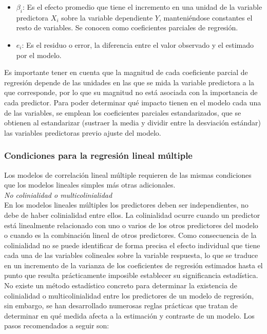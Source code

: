 {\begin{itemize}
\item $\beta_i$: Es el efecto promedio que tiene el incremento en una unidad de la variable predictora $X_i$ sobre la variable dependiente $Y$, manteniéndose constantes el resto de variables. Se conocen como coeficientes parciales de regresión.
\item $e_i$: Es el residuo o error, la diferencia entre el valor observado y el estimado por el modelo.
\end{itemize}

\noindent Es importante tener en cuenta que la magnitud de cada coeficiente parcial de regresión depende de las unidades en las que se mida la variable predictora a la que corresponde, por lo que su magnitud no está asociada con la importancia de cada predictor. Para poder determinar qué impacto tienen en el modelo cada una de las variables, se emplean los coeficientes parciales estandarizados, que se obtienen al estandarizar (sustraer la media y dividir entre la desviación estándar) las variables predictoras previo ajuste del modelo.

\subsubsection{Condiciones para la regresión lineal múltiple}
\noindent Los modelos de correlación lineal múltiple requieren de las mismas condiciones que los modelos lineales simples más otras adicionales.\\

\textit{No colinialidad o multicolinialidad}\\

\noindent En los modelos lineales múltiples los predictores deben ser independientes, no debe de haber colinialidad entre ellos. La colinialidad ocurre cuando un predictor está linealmente relacionado con uno o varios de los otros predictores del modelo o cuando es la combinación lineal de otros predictores. Como consecuencia de la colinialidad no se puede identificar de forma precisa el efecto individual que tiene cada una de las variables colineales sobre la variable respuesta, lo que se traduce en un incremento de la varianza de los coeficientes de regresión estimados hasta el punto que resulta prácticamente imposible establecer su significancia estadística.\\

\noindent No existe un método estadístico concreto para determinar la existencia de colinialidad o multicolinialidad entre los predictores de un modelo de regresión, sin embargo, se han desarrollado numerosas reglas prácticas que tratan de determinar en qué medida afecta a la estimación y contraste de un modelo. Los pasos recomendados a seguir son:

}

